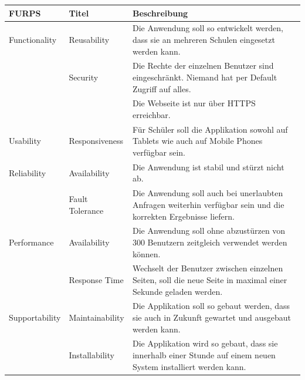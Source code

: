 \begin{table}[h]
	\centering
	\begin{tabu} to 0.9\textwidth {l l X}
	\toprule
	FURPS & Titel & Beschreibung \\ 
	\midrule
	Functionality & Reusability & Die Anwendung soll so entwickelt werden, dass sie an mehreren Schulen eingesetzt werden kann. \\
	& 	Security & Die Rechte der einzelnen Benutzer sind eingeschränkt. Niemand hat per Default Zugriff auf alles. \\
	&  & Die Webseite ist nur über HTTPS erreichbar. \\
	\midrule
	Usability & Responsiveness & Für Schüler soll die Applikation sowohl auf Tablets wie auch auf Mobile Phones verfügbar sein. \\
	\midrule
	Reliability & Availability & Die Anwendung ist stabil und stürzt nicht ab. \\
	& Fault Tolerance & Die Anwendung soll auch bei unerlaubten Anfragen weiterhin verfügbar sein und die korrekten Ergebnisse liefern. \\
	\midrule
	Performance & Availability & Die Anwendung soll ohne abzustürzen von 300 Benutzern zeitgleich verwendet werden können. \\
	 & Response Time & Wechselt der Benutzer zwischen einzelnen Seiten, soll die neue Seite in maximal einer Sekunde geladen werden.\\
	\midrule
	Supportability & Maintainability & Die Applikation soll so gebaut werden, dass sie auch in Zukunft gewartet und ausgebaut werden kann. \\
	 & Installability & Die Applikation wird so gebaut, dass sie innerhalb einer Stunde auf einem neuen System installiert werden kann. \\
	\bottomrule
	\end{tabu}
	\label{nfr}
\end{table}


\newpage